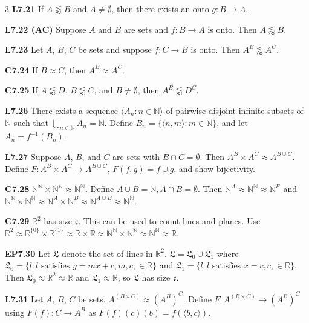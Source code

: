 \documentclass[10pt, landscape]{article}
\begin{document}
\begin{multicols*}{3}
\textbf{L7.21} If $A \lessapprox B$ and $A \neq \emptyset$, then there exists an onto $g:B\rightarrow A$.

\textbf{L7.22 (AC)} Suppose $A$ and $B$ are sets and $f: B \rightarrow A$ is onto. Then $A \lessapprox B$.

\textbf{L7.23} Let $A$, $B$, $C$ be sets and suppose $f:C\rightarrow B$ is onto. Then $A^B \lessapprox A^C$.

\textbf{C7.24} If $B \approx C$, then $A^B \approx A^C$.

\textbf{C7.25} If $A \lessapprox D$, $B \lessapprox C$, and $B \neq \emptyset$, then $A^B \lessapprox D^C$.

\textbf{L7.26} There exists a sequence $\langle A_n: n \in \mathbb{N} \rangle$ of pairwise disjoint infinite subsets of $\mathbb{N}$ such that $\bigcup_{n\in \mathbb{N}}A_n=\mathbb{N}$. Define $B_n=\{\langle n, m \rangle:m \in \mathbb{N}\}$, and let $A_n=f^{-1}(B_n)$.

\textbf{L7.27} Suppose $A$, $B$, and $C$ are sets with $B \cap C = \emptyset$. Then $A^B \times A^C \approx A^{B \cup C}$. Define $F:A^B\times A^C \rightarrow A^{B \cup C}$, $F(f, g) = f \cup g$, and show bijectivity.

\textbf{C7.28} $\mathbb{N}^\mathbb{N} \times \mathbb{N}^\mathbb{N} \approx \mathbb{N}^\mathbb{N}$. Define $A \cup B = \mathbb{N}, A \cap B = \emptyset$. Then $\mathbb{N}^A\approx \mathbb{N}^\mathbb{N} \approx \mathbb{N}^B$ and $\mathbb{N}^\mathbb{N}\times\mathbb{N}^\mathbb{N}\approx \mathbb{N}^A\times\mathbb{N}^B\approx \mathbb{N}^{A \cup B}\approx \mathbb{N}^\mathbb{N}$.

\textbf{C7.29} $\mathbb{R}^2$ has size $\mathfrak{c}$. This can be used to count lines and planes. Use $\mathbb{R}^2\approx\mathbb{R}^{\{0\}}\times \mathbb{R}^{\{1\}}\approx \mathbb{R} \times \mathbb{R} \approx \mathbb{N}^\mathbb{N} \times \mathbb{N}^\mathbb{N} \approx \mathbb{N}^\mathbb{N}\approx\mathbb{R}$.

\textbf{EP7.30} Let $\mathfrak{L}$ denote the set of lines in $\mathbb{R}^2$. $\mathfrak{L}=\mathfrak{L}_0\cup \mathfrak{L}_1$ where $\mathfrak{L}_0=\{l : l \text{ satisfies } y = mx+c, m, c, \in \mathbb{R} \}$ and $\mathfrak{L}_1=\{l : l \text{ satisfies } x=c, c, \in \mathbb{R} \}$. Then $\mathfrak{L}_0\approx\mathbb{R}^2\approx \mathbb{R}$ and $\mathfrak{L}_1\approx \mathbb{R}$, so $\mathfrak{L}$ has size $\mathfrak{c}$.

\textbf{L7.31} Let $A$, $B$, $C$ be sets. $A^{(B \times C)}\approx (A^B)^C$. Define $F:A^{(B \times C)} \rightarrow (A^B)^C$ using $F(f):C\rightarrow A^B$ as $F(f)(c)(b)=f(\langle b,c \rangle)$.


\end{multicols*}
\end{document}
